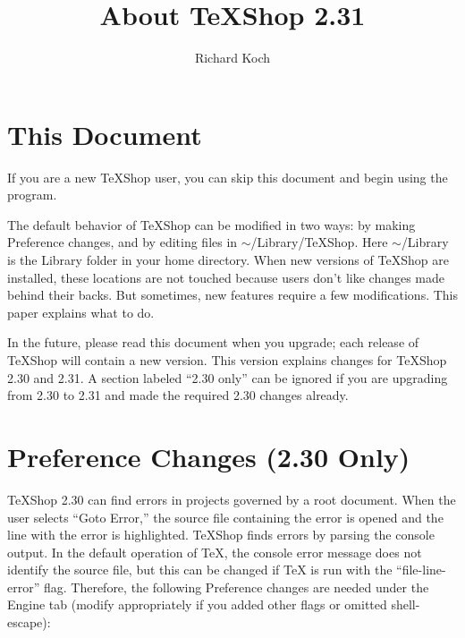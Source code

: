 \documentclass[11pt, oneside]{amsart}
\title{About TeXShop 2.31 }
\author{Richard Koch}
\begin{document}
\maketitle

\thispagestyle{empty}
\section{This Document}

If you are a new TeXShop user, you can skip this document and begin using the program.

The default behavior of TeXShop can be modified in two ways: by making Preference changes, and by editing files in $\sim$/Library/TeXShop. Here $\sim$/Library is the Library folder in your home directory. When new versions of TeXShop are installed, these locations are not touched because users don't like changes made behind their backs. But sometimes, new features require a few modifications. This paper explains what to do. 

In the future, please read this document when you upgrade; each release of TeXShop will contain a new version. This version explains changes for TeXShop 2.30 and 2.31. A section labeled ``2.30 only'' can be ignored if you are upgrading from 2.30 to 2.31 and made the required 2.30 changes already.
\section{Preference Changes (2.30 Only)}

TeXShop 2.30 can find errors in projects governed by a root document. When the user selects ``Goto Error,'' the source file containing the error is opened and the line with the error is highlighted. TeXShop finds errors by parsing the console output. In the default operation of TeX, the console error message does not identify the source file, but this can be changed if TeX is run with the ``file-line-error'' flag. Therefore, the following Preference changes are needed under the Engine tab (modify appropriately if you added other flags or omitted shell-escape):
\end{document}
